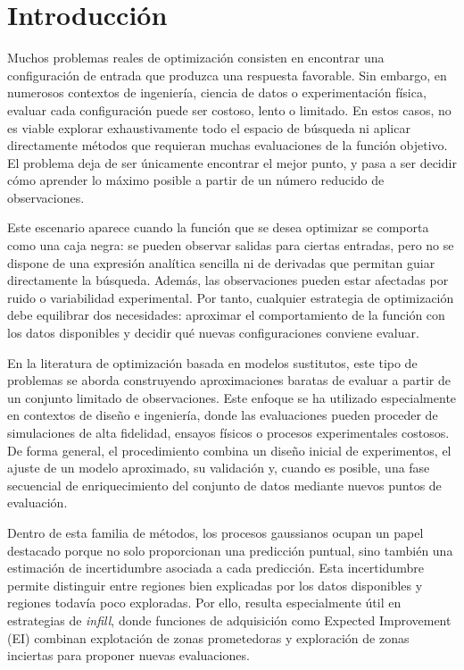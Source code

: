 \chapter{Introducción}
\label{chap:introduccion}

Muchos problemas reales de optimización consisten en encontrar una configuración de entrada que produzca una respuesta favorable. Sin embargo, en numerosos contextos de ingeniería, ciencia de datos o experimentación física, evaluar cada configuración puede ser costoso, lento o limitado. En estos casos, no es viable explorar exhaustivamente todo el espacio de búsqueda ni aplicar directamente métodos que requieran muchas evaluaciones de la función objetivo. El problema deja de ser únicamente encontrar el mejor punto, y pasa a ser decidir cómo aprender lo máximo posible a partir de un número reducido de observaciones.

Este escenario aparece cuando la función que se desea optimizar se comporta como una caja negra: se pueden observar salidas para ciertas entradas, pero no se dispone de una expresión analítica sencilla ni de derivadas que permitan guiar directamente la búsqueda. Además, las observaciones pueden estar afectadas por ruido o variabilidad experimental. Por tanto, cualquier estrategia de optimización debe equilibrar dos necesidades: aproximar el comportamiento de la función con los datos disponibles y decidir qué nuevas configuraciones conviene evaluar.

En la literatura de optimización basada en modelos sustitutos, este tipo de problemas se aborda construyendo aproximaciones baratas de evaluar a partir de un conjunto limitado de observaciones. Este enfoque se ha utilizado especialmente en contextos de diseño e ingeniería, donde las evaluaciones pueden proceder de simulaciones de alta fidelidad, ensayos físicos o procesos experimentales costosos. De forma general, el procedimiento combina un diseño inicial de experimentos, el ajuste de un modelo aproximado, su validación y, cuando es posible, una fase secuencial de enriquecimiento del conjunto de datos mediante nuevos puntos de evaluación.

Dentro de esta familia de métodos, los procesos gaussianos ocupan un papel destacado porque no solo proporcionan una predicción puntual, sino también una estimación de incertidumbre asociada a cada predicción. Esta incertidumbre permite distinguir entre regiones bien explicadas por los datos disponibles y regiones todavía poco exploradas. Por ello, resulta especialmente útil en estrategias de \emph{infill}, donde funciones de adquisición como Expected Improvement (EI) combinan explotación de zonas prometedoras y exploración de zonas inciertas para proponer nuevas evaluaciones.

